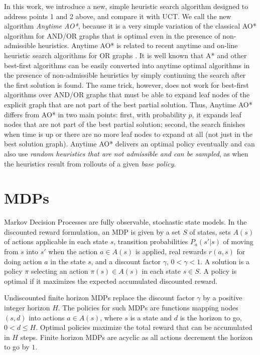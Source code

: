\documentclass[letterpaper]{article}
\newcommand{\Omit}[1]{}
\begin{document}
In this work, we  introduce a new, simple heuristic search algorithm designed to  address points  1 and 2 above,
and compare it with UCT. We call the new algorithm \emph{Anytime AO*}, because it is a
very simple variation of the classical AO* algorithm for  AND/OR graphs \cite{nilsson:book}
that is optimal even
in the presence of non-admissible heuristics. Anytime AO* is related  to recent
anytime and on-line heuristic search algorithms for OR graphs \cite{likhachev:ara,hansen:anytime,koenig:2009,thayer-ruml:anytime}.
It is well known that A* and other best-first algorithms can be  easily converted into anytime optimal algorithms
in the presence of non-admissible heuristics by simply continuing  the search after the first solution is found. The same trick, however,
does not work for  best-first algorithms over AND/OR graphs that must be able to expand leaf nodes of
the explicit graph that are not part of the best partial solution.
Thus, Anytime AO* differs from AO* in two main points: first, with probability $p$,
it expands leaf nodes that are not part of the best partial solution; second,
the search finishes when time is up or there are no more leaf nodes to expand at all
(not just in the best solution graph). Anytime AO*  delivers an optimal policy eventually
and can also use \emph{random heuristics that are not admissible and can be sampled},
as when the heuristics result from rollouts of a given \emph{base policy}.

\Omit{
The paper is organized as follows. We review MDPs, AO* and UCT, and then introduce Anytime AO* and
compare it with UCT. }

\section{MDPs}

Markov Decision Processes are fully observable, stochastic state models.
In the discounted reward formulation, an MDP is given by a set $S$ of states,
sets $A(s)$  of actions applicable in each state $s$, transition probabilities
$P_a(s'|s)$ of moving from $s$ into $s'$ when the action $a \in A(s)$ is applied,
real rewards  $r(a,s)$ for  doing action $a$ in the state $s$, and a discount
factor $\gamma$, $0 < \gamma < 1$. A solution  is a policy $\pi$
selecting an action $\pi(s) \in A(s)$ in each state $s \in S$. A policy is
optimal if it maximizes the expected accumulated discounted reward.

Undiscounted finite horizon MDPs replace the discount factor $\gamma$
by a positive integer horizon $H$. The policies for such MDPs are
functions  mapping nodes $(s,d)$ into actions $a \in A(s)$, where $s$
is a state and $d$ is the horizon to go, $0 <  d \leq H$. Optimal
policies maximize the total reward that can be accumulated in $H$
steps. Finite horizon MDPs are acyclic as all actions decrement the
horizon to go by $1$.
\end{document}
